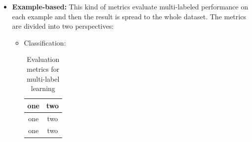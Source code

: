 \documentclass[12pt]{report}
\begin{document}
	\begin{itemize}
		\item \textbf{Example-based: }This kind of metrics evaluate multi-labeled performance on each example and then the result is spread to the whole dataset. The metrics are divided into two perspectives:
		\begin{itemize}
			\item Classification:
        \begin{table}
          \centering
          \begin{tabular}{cc} 
          \toprule
            one & two \\
          \midrule
            one & two \\
            one & two \\
          \bottomrule
          \end{tabular}
          \caption{Evaluation metrics for multi-label learning}
          \label{label:evaluation_metrics}
        \end{table}


\end{itemize}
\end{itemize}
\end{document}
